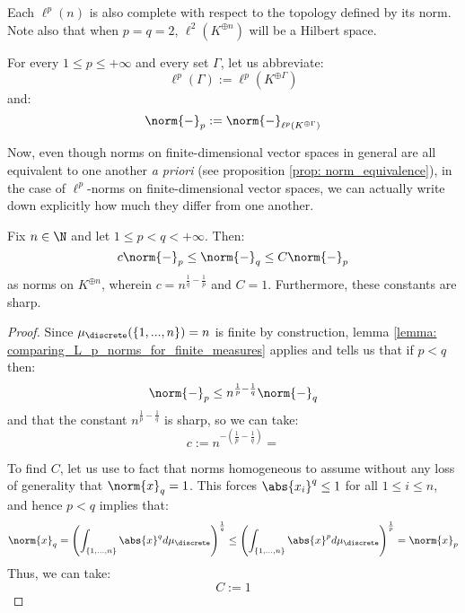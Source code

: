 \begin{example}
            Each $\ell^p(n)$ is also complete with respect to the topology defined by its norm. Note also that when $p = q = 2$, $\ell^2(K^{\oplus n})$ will be a Hilbert space.
        \end{example}

        \begin{convention}
            For every $1 \leq p \leq +\infty$ and every set $\Gamma$, let us abbreviate:
                $$\ell^p(\Gamma) := \ell^p(K^{\oplus \Gamma})$$
            and:
                $$\norm{-}_p := \norm{-}_{\ell^p(K^{\oplus \Gamma})}$$
        \end{convention}

        Now, even though norms on finite-dimensional vector spaces in general are all equivalent to one another \textit{a priori} (see proposition \ref{prop: norm_equivalence}), in the case of $\ell^p$-norms on finite-dimensional vector spaces, we can actually write down explicitly how much they differ from one another.
        \begin{lemma} \label{lemma: sharp_comparison_of_ell_p_norms_in_finite_dimensions}
            Fix $n \in \N$ and let $1 \leq p < q < +\infty$. Then:
                $$c \norm{-}_p \leq \norm{-}_q \leq C \norm{-}_p$$
            as norms on $K^{\oplus n}$, wherein $c = n^{\frac1q - \frac1p}$ and $C = 1$. Furthermore, these constants are sharp.
        \end{lemma}
            \begin{proof}
                Since $\mu_{\discrete}(\{1, ..., n\}) = n$ is finite by construction, lemma \ref{lemma: comparing_L_p_norms_for_finite_measures} applies and tells us that if $p < q$ then:
                    $$\norm{-}_p \leq n^{\frac1p - \frac1q} \norm{-}_q$$
                and that the constant $n^{\frac1p - \frac1q}$ is sharp, so we can take:
                    $$c := n^{-(\frac1p - \frac1q)} = $$

                To find $C$, let us use to fact that norms homogeneous to assume without any loss of generality that $\norm{x}_q = 1$. This forces $\abs{x_i}^q \leq 1$ for all $1 \leq i \leq n$, and hence $p < q$ implies that:
                    $$\norm{x}_q = \left( \int_{\{1, ..., n\}} \abs{x}^q d\mu_{\discrete} \right)^{\frac1q} \leq \left( \int_{\{1, ..., n\}} \abs{x}^p d\mu_{\discrete} \right)^{\frac1p} = \norm{x}_p$$
                Thus, we can take:
                    $$C := 1$$
            \end{proof}

